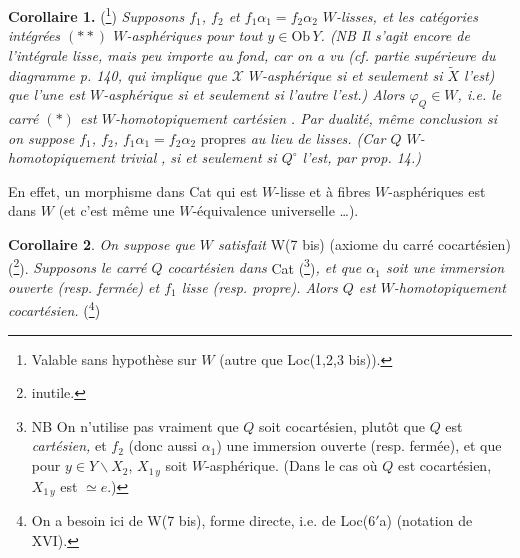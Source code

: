 \documentclass[11pt]{article}
\newcommand{\printedpage}[1]{\marginpar{\footnotesize p.~#1}}
\newcommand{\msp}[1]{\marginpar{\footnotesize [#1]}}
\begin{document}
\textbf{Corollaire 1.} (\footnote{Valable sans hypothèse sur $W$ (autre que Loc(1,2,3 bis)).}) \textit{Supposons $f_1$, $f_2$ et $f_1\alpha_1 = f_2\alpha_2$ $W$-lisses, et les catégories intégrées $(**)$ $W$-asphériques pour tout $y \in \mathrm{Ob}\,Y$. (NB Il s'agit encore de l'intégrale lisse, mais peu importe au fond, car on a vu (cf. partie supérieure du diagramme p. 140, qui implique que $\mathcal{X}$} \textit{$W$-asphérique si et seulement si $\tilde{X}$ l'est) que l'une est $W$-asphérique si et seulement si l'autre l'est.) Alors $\varphi_Q \in W$, i.e. le carré $(*)$ est $W$-homotopiquement cartésien} \textit{. Par dualité, même conclusion si on suppose $f_1$, $f_2$, $f_1\alpha_1 = f_2\alpha_2$} propres \textit{au lieu de lisses. (Car $Q$ $W$-homotopiquement trivial} \textit{, si et seulement si $Q^\circ$ l'est, par} \textit{prop. 14.)}

\msp{page 148}En effet, un morphisme dans Cat qui est $W$-lisse et à fibres $W$-asphériques est dans $W$ (et c'est même une $W$-équivalence universelle \dots).

\textbf{Corollaire 2}. \textit{On suppose que $W$ satisfait} W(7 bis) (axiome du carré cocartésien) (\footnote{inutile.}).
\printedpage{102}
\textit{Supposons le carré $Q$ cocartésien dans} Cat (\footnote{NB On n'utilise pas vraiment que $Q$ soit cocartésien, plutôt que $Q$ est \textit{cartésien,} et $f_2$ (donc aussi $\alpha_1$) une immersion ouverte (resp. fermée), et que pour $y \in Y\backslash X_2$, $X_{1\,y}$ soit $W$-asphérique. (Dans le cas où $Q$ est cocartésien, $X_{1\,y}$ est $\simeq e$.)})\textit{, et que $\alpha_1$ soit une immersion ouverte (resp. fermée) et $f_1$ lisse (resp. propre). Alors $Q$ est $W$-homotopiquement cocartésien.} (\footnote{On a besoin ici de W(7 bis), forme directe, i.e. de Loc(6$'$a) (notation de XVI).})
\end{document}
